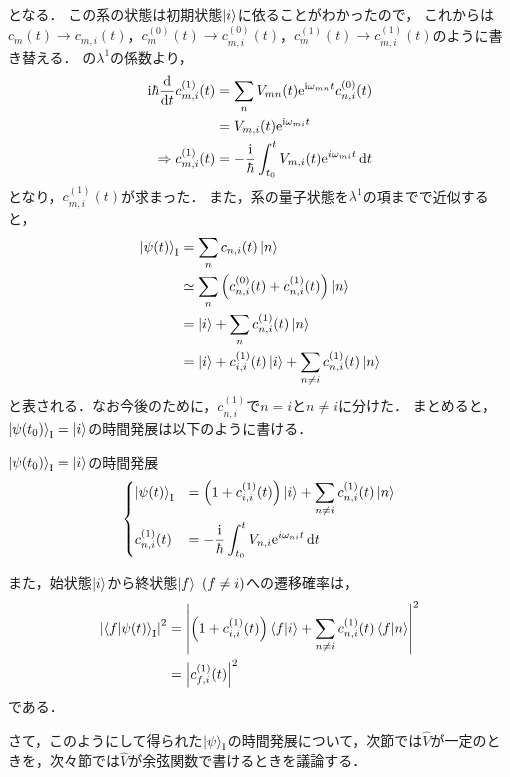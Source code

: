 \documentclass{report}
\begin{document}
  となる．
  この系の状態は初期状態$\ket{i}$に依ることがわかったので，
  これからは$c_m(t) \to c_{m, i}(t)$，$c_m^{(0)}(t) \to c_{m, i}^{(0)}(t)$，$c_m^{(1)}(t) \to c_{m, i}^{(1)}(t)$のように書き替える．
  の$\lambda^1$の係数より，
  \begin{align}
    \mathrm{i}\hbar\dv{t}c_{m, i}^{(1)}(t)& = \sum_{n}V_{mn}(t)\mathrm{e}^{\mathrm{i}\omega_{mn}t}c_{n, i}^{(0)}(t)\\
    & = V_{m, i}(t)\mathrm{e}^{\mathrm{i}\omega_{mi}t} \\
    \Rightarrow c_{m, i}^{(1)}(t)& = -\frac{\mathrm{i}}{\hbar}\int_{t_0}^{t}V_{m, i}(t)\mathrm{e}^{i\omega_{mi}t}\dd{t}\label{cmi1t-progress}
  \end{align}
  となり，$c_{m, i}^{(1)}(t)$が求まった．
  また，系の量子状態を$\lambda^1$の項までで近似すると，
  \begin{align}
    \ket{\psi(t)}_{\mathrm{I}} &= \sum_{n}c_{n, i}(t)\ket{n} \\ 
    &\simeq \sum_{n} \qty(c_{n, i}^{(0)}(t) + c_{n, i}^{(1)}(t))\ket{n} \\ 
    &= \ket{i} + \sum_{n}c_{n, i}^{(1)}(t)\ket{n} \\ 
    &= \ket{i} + c_{i, i}^{(1)}(t)\ket{i} + \sum_{n\neq i}c_{n, i}^{(1)}(t)\ket{n}
  \end{align}
  と表される．なお今後のために，$c_{n, i}^{(1)}$で$n = i$と$n \neq i$に分けた．
  まとめると，$\ket{\psi(t_0)}_{\mathrm{I}} = \ket{i}$の時間発展は以下のように書ける．
  \begin{itembox}[l]{$\ket{\psi(t_0)}_{\mathrm{I}} = \ket{i}$の時間発展}
    \begin{align}
      \begin{dcases}
        \ket{\psi(t)}_{\mathrm{I}}& = \qty(1 + c_{i, i}^{(1)}(t))\ket{i} + \sum_{n\neq i}c_{n, i}^{(1)}(t)\ket{n}\label{interaction-picture-time-development-of-qc} \\
        c_{n, i}^{(1)}(t) &= -\frac{\mathrm{i}}{\hbar}\int_{t_0}^{t}V_{n, i}\mathrm{e}^{i\omega_{ni}t}\dd{t}
      \end{dcases}
    \end{align}
  \end{itembox}
  また，始状態$\ket{i}$から終状態$\ket{f}\ (f\neq i)$への遷移確率は，
  \begin{align}
    \abs{\braket{f}{\psi(t)}_{\mathrm{I}}}^2 &= \abs{\qty(1 + c_{i, i}^{(1)}(t))\braket{f}{i} + \sum_{n\neq i}c_{n, i}^{(1)}(t)\braket{f}{n}}^2 \\ 
    &= \abs{c_{f, i}^{(1)}(t)}^2
  \end{align}
  である．
  \par
  さて，このようにして得られた$\ket{\psi}_{\mathrm{I}}$の時間発展について，次節では$\hat{V}$が一定のときを，次々節では$\hat{V}$が余弦関数で書けるときを議論する．
\end{document}

